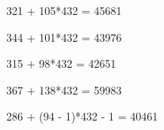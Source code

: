 321 + 105*432 = 45681

344 + 101*432 = 43976


315 + 98*432 = 42651


367 + 138*432 = 59983

286  + (94 - 1)*432 - 1 = 40461

